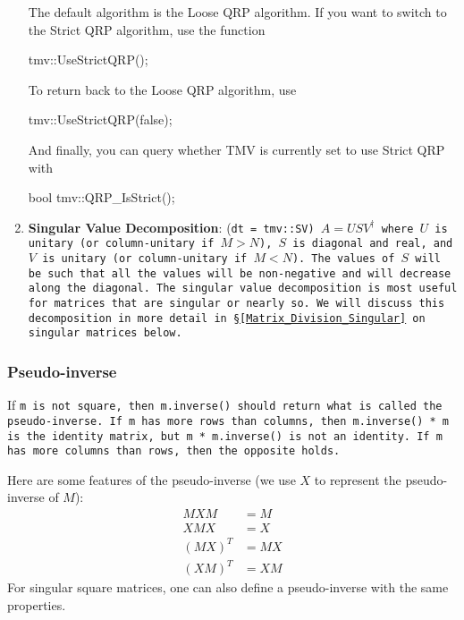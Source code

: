 \begin{enumerate}
The default algorithm is the Loose QRP algorithm.  If you want to switch to the Strict QRP
algorithm, use the function
\begin{tmvcode}
tmv::UseStrictQRP();
\end{tmvcode}
To return back to the Loose QRP algorithm, use
\begin{tmvcode}
tmv::UseStrictQRP(false);
\end{tmvcode}
And finally, you can query whether TMV is currently set to use Strict QRP with
\begin{tmvcode}
bool tmv::QRP_IsStrict();
\end{tmvcode}

\item
\textbf{Singular Value Decomposition}: 
(\tt{dt} = \tt{tmv::SV}) $A = U S V^\dagger$ where $U$ is unitary
(or column-unitary if $M > N$), $S$ is diagonal and real, and $V$ is unitary 
(or column-unitary if $M < N$).  The values of $S$ will be such that all the values will
be non-negative and will decrease along the diagonal.
The singular value decomposition is most useful
for matrices that are singular or nearly so.  
We will discuss this decomposition in more detail in \S\ref{Matrix_Division_Singular} on
singular matrices below.

\end{enumerate}

\subsubsection{Pseudo-inverse}
\label{Matrix_Division_Pseudoinverse}

If \tt{m} is not square, then \tt{m.inverse()} should return what is called the pseudo-inverse.
If \tt{m} has more rows than columns, then \tt{m.inverse() * m} is the identity matrix, 
but \tt{m * m.inverse()}
is not an identity.  If \tt{m} has more columns than rows, then the opposite holds.

Here are some features of the pseudo-inverse (we use $X$ to represent the pseudo-inverse
of $M$):
\begin{align*}
M X M &= M \\
X M X &= X \\
(M X)^T &= M X \\
(X M)^T &= X M 
\end{align*}
For singular square matrices, 
one can also define a pseudo-inverse with the same properties.


